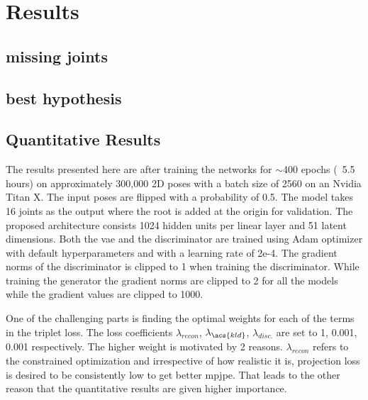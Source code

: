 \chapter{Results} 
\label{chap:results}


% 

\section{missing joints}
\section{best hypothesis}

\section{Quantitative Results}

The results presented here are after training the networks for $\sim$400 epochs (~5.5 hours) on approximately 300,000 2D poses with a batch size of 2560 on an Nvidia Titan X. The input poses are flipped with a probability of 0.5. The model takes 16 joints as the output where the root is added at the origin for validation. The proposed architecture consists 1024 hidden units per linear layer and 51 latent dimensions. Both the \ac{vae} and the discriminator are trained using Adam optimizer with default hyperparameters and with a learning rate of 2e-4. The gradient norms of the discriminator is clipped to 1 when training the discriminator. While training the generator the gradient norms are clipped to 2 for all the models while the gradient values are clipped to 1000.  

One of the challenging parts is finding the optimal weights for each of the terms in the triplet loss. The loss coefficients $\lambda_{recon}$, $\lambda_{\acs{kld}}$, $\lambda_{disc.}$ are set to 1, 0.001, 0.001 respectively. The higher weight is motivated by 2 reasons. $\lambda_{recon}$ refers to the constrained optimization and irrespective of how realistic it is, projection loss is desired to be consistently low to get better \ac{mpjpe}. That leads to the other reason that the quantitative results are given higher importance. 

